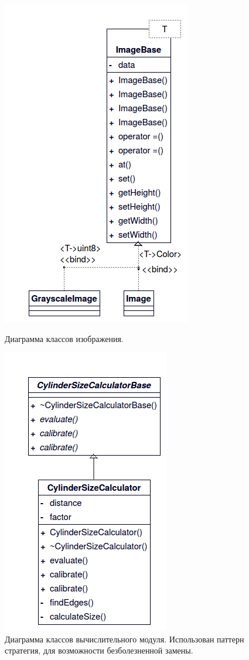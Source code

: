 \begin{figure}[H]
	\centering
	\begin{minipage}{.5\textwidth}
		\includegraphics[scale=0.65]{classes/image.png}
		\caption{Диаграмма классов изображения.}
		\label{class:image}
	\end{minipage}%
	\begin{minipage}{.5\textwidth}
		\includegraphics[scale=0.65]{classes/cylindersize.png}
		\caption{Диаграмма классов вычислительного модуля. Использован паттерн стратегия, для возможности безболезненной замены.}
		\label{class:cylindersize}
	\end{minipage}
	
\end{figure}

